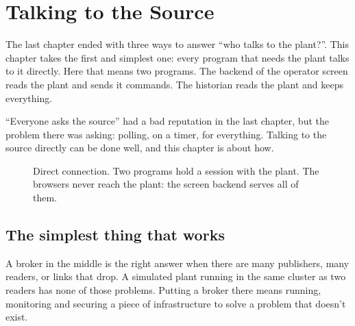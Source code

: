 \chapter{Talking to the Source}

The last chapter ended with three ways to answer ``who talks to the plant?''.
This chapter takes the first and simplest one: every program that needs the
plant talks to it directly. Here that means two programs. The backend of the
operator screen reads the plant and sends it commands. The historian reads the
plant and keeps everything.

``Everyone asks the source'' had a bad reputation in the last chapter, but the
problem there was asking: polling, on a timer, for everything. Talking to the
source directly can be done well, and this chapter is about how.

\begin{figure}[htbp]
\centering
{}
\caption{Direct connection. Two programs hold a session with the plant. The
browsers never reach the plant: the screen backend serves all of them.}
\end{figure}

\section{The simplest thing that works}

A broker in the middle is the right answer when there are many publishers, many
readers, or links that drop. A simulated plant running in the same cluster as
two readers has none of those problems. Putting a broker there means running,
monitoring and securing a piece of infrastructure to solve a problem that
doesn't exist.

